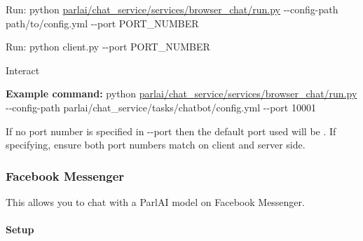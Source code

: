 \begin{DoxyEnumerate}
\item Run\+: {\ttfamily python \hyperlink{parlai_2chat__service_2services_2browser__chat_2run_8py}{parlai/chat\+\_\+service/services/browser\+\_\+chat/run.\+py} -\/-\/config-\/path path/to/config.\+yml -\/-\/port P\+O\+R\+T\+\_\+\+N\+U\+M\+B\+ER}
\item Run\+: {\ttfamily python client.\+py -\/-\/port P\+O\+R\+T\+\_\+\+N\+U\+M\+B\+ER}
\item Interact
\end{DoxyEnumerate}

{\bfseries Example command\+:} {\ttfamily python \hyperlink{parlai_2chat__service_2services_2browser__chat_2run_8py}{parlai/chat\+\_\+service/services/browser\+\_\+chat/run.\+py} -\/-\/config-\/path parlai/chat\+\_\+service/tasks/chatbot/config.\+yml -\/-\/port 10001}

If no port number is specified in {\ttfamily -\/-\/port} then the default port used will be {}. If specifying, ensure both port numbers match on client and server side.

\subsubsection*{Facebook Messenger}

This allows you to chat with a Parl\+AI model on Facebook Messenger.



\paragraph*{Setup}


